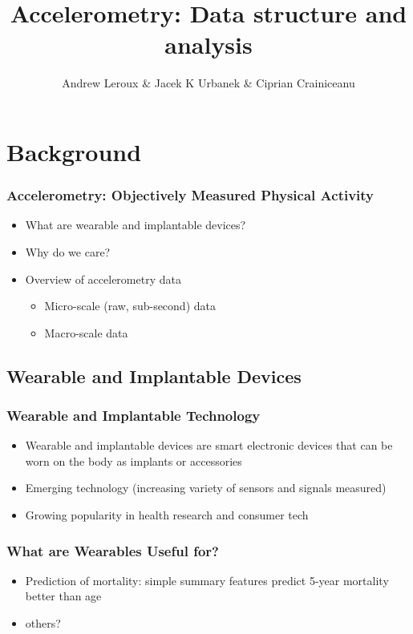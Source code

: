 \documentclass[10pt]{beamer}\usepackage[]{graphicx}\usepackage[]{color}
\newcommand\makebeamertitle{\frame{\maketitle}}%
\begin{document}
\title[]{Accelerometry: Data structure and analysis}
\author[]{Andrew Leroux \& Jacek K Urbanek \& Ciprian Crainiceanu}
\makebeamertitle




\section{Background}

\begin{frame}
\frametitle{Accelerometry: Objectively Measured Physical Activity}
\begin{itemize}
\item What are wearable and implantable devices?
\item Why do we care?
\item Overview of accelerometry data 
    \begin{itemize}
    \item Micro-scale (raw, sub-second) data
    \item Macro-scale data
    \end{itemize}
\end{itemize}
\end{frame}


\subsection{Wearable and Implantable Devices}


\begin{frame}
\frametitle{Wearable and Implantable Technology}
\begin{itemize}
\item Wearable and implantable devices are smart electronic devices that can be worn on the body as implants or accessories
\item Emerging technology (increasing variety of sensors and signals measured)
\item Growing popularity in health research and consumer tech
\end{itemize}
\end{frame}


\begin{frame}
\frametitle{What are Wearables Useful for?}
\begin{itemize}
\item Prediction of mortality: simple summary features predict 5-year mortality better than age
\item others?
\end{itemize}
\end{frame}
\end{document}
